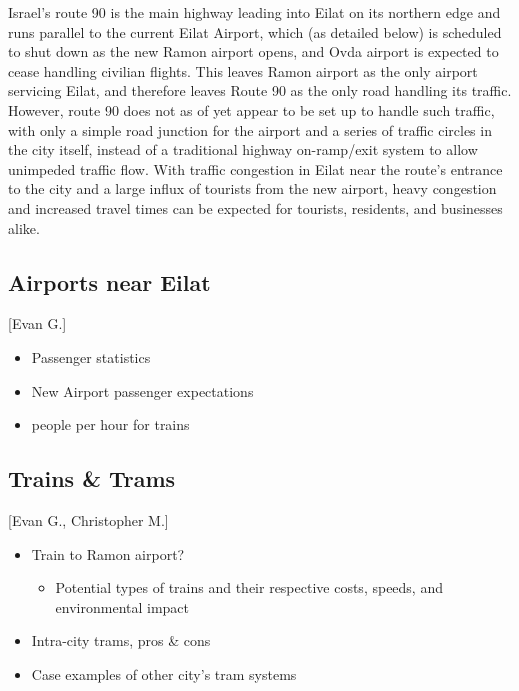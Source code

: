 \documentclass[12pt]{article}                         %
\begin{document}
Israel's route 90 is the main highway leading into Eilat on its northern edge and runs parallel to the current Eilat Airport, which (as detailed below) is scheduled to shut down as the new Ramon airport opens, and Ovda airport is expected to cease handling civilian flights. This leaves Ramon airport as the only airport servicing Eilat, and therefore leaves Route 90 as the only road handling its traffic. However, route 90 does not as of yet appear to be set up to handle such traffic, with only a simple road junction for the airport and a series of traffic circles in the city itself, instead of a traditional highway on-ramp/exit system to allow unimpeded traffic flow. With traffic congestion in Eilat near the route's entrance to the city and a large influx of tourists from the new airport, heavy congestion and increased travel times can be expected for tourists, residents, and businesses alike.

\subsection{Airports near Eilat}[Evan G.]
\begin{itemize}
    \item Passenger statistics
    \item New Airport passenger expectations
    \item people per hour for trains
\end{itemize}

\subsection{Trains \& Trams}[Evan G., Christopher M.]
\begin{itemize}
    \item Train to Ramon airport?
		\begin{itemize}
			\item Potential types of trains and their respective costs, speeds, and environmental impact
    	\end{itemize}
    \item Intra-city trams, pros \& cons
    \item Case examples of other city's tram systems
\end{itemize}

\end{document}
